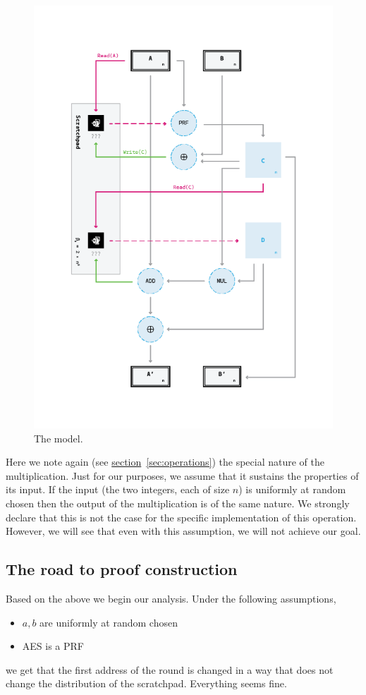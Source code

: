 \begin{figure}[H]
  \centering
  \includegraphics[scale=0.55, keepaspectratio]{Images/Bill/model.png}
  \caption{The model.~\cite{bill}}
  \label{fig:model}
\end{figure}

Here we note again (see \hyperref[sec:operations]{section}~\ref{sec:operations}) the special nature of the multiplication. Just for our purposes, we assume that it sustains the properties of its input. If the input (the two integers, each of size $n$) is uniformly at random chosen then the output of the multiplication is of the same nature. We strongly declare that this is not the case for the specific implementation of this operation. However, we will see that even with this assumption, we will not achieve our goal.

\subsection{The road to proof construction}
Based on the above we begin our analysis. Under the following assumptions,
\begin{itemize}
  \item $a,b$ are uniformly at random chosen
  \item AES is a PRF
\end{itemize}
we get that the first address of the round is changed in a way that does not change the distribution of the scratchpad. Everything seems fine.

